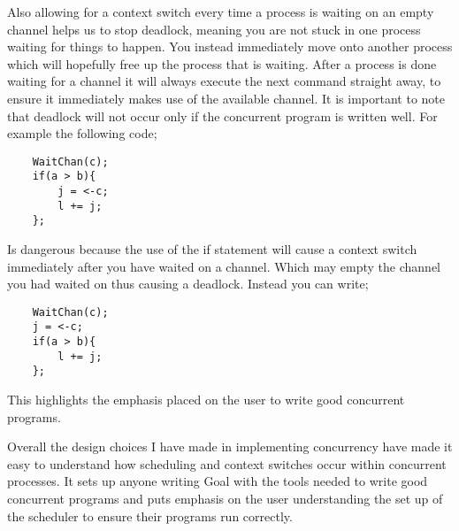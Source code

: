 Also allowing for a context switch every time a process is waiting on an empty channel helps us to stop deadlock, meaning you are not stuck in one process waiting for things to happen. You instead immediately move onto another process which will hopefully free up the process that is waiting. After a process is done waiting for a channel it will always execute the next command straight away, to ensure it immediately makes use of the available channel.  It is important to note that deadlock will not occur only if the concurrent program is written well. For example the following code;

\begin{lstlisting}
	WaitChan(c);
	if(a > b){
		j = <-c;
		l += j;
	};
\end{lstlisting}     

Is dangerous because the use of the if statement will cause a context switch immediately after you have waited on a channel. Which may empty the channel you had waited on thus causing a deadlock. Instead you can write;

\begin{lstlisting}
	WaitChan(c);
	j = <-c;
	if(a > b){	
		l += j;
	};
\end{lstlisting}

This highlights the emphasis placed on the user to write good concurrent programs. 

Overall the design choices I have made in implementing concurrency have made it easy to understand how scheduling and context switches occur within concurrent processes. It sets up anyone writing Goal with the tools needed to write good concurrent programs and puts emphasis on the user understanding the set up of the scheduler to ensure their programs run correctly.  
 
